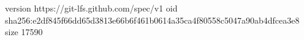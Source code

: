 version https://git-lfs.github.com/spec/v1
oid sha256:e2df845f66dd65d3813e66b6f461b0614a35ca4f80558c5047a90ab4dfcea3e8
size 17590
